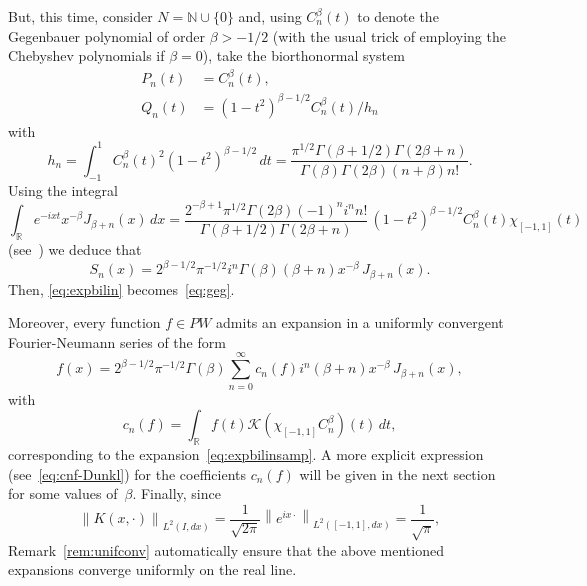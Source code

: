 \documentclass[11pt,a4paper]{amsart}
\theoremstyle{plain}
\theoremstyle{definition}
\newcommand{\N}{\mathbb{N}}
\newcommand{\R}{\mathbb{R}}
\newcommand{\calK}{\mathcal{K}}
\begin{document}
But, this time, consider $N = \N \cup \{0\}$ and,
using $C_n^\beta(t)$ to denote the Gegenbauer polynomial of order
$\beta > -1/2$ (with the usual trick of employing the Chebyshev
polynomials if $\beta = 0$), take the biorthonormal system
\begin{align*}
  P_{n}(t) &= C_{n}^{\beta}(t),\\
  Q_{n}(t) &= (1-t^2)^{\beta-1/2} C_{n}^{\beta}(t)/h_n
\end{align*}
with
\begin{equation*}
  h_n = \int_{-1}^1 C_{n}^{\beta}(t)^2 (1-t^2)^{\beta-1/2}\,dt
  = \frac{\pi^{1/2}\Gamma(\beta+1/2)\Gamma(2\beta+n)}
  {\Gamma(\beta)\Gamma(2\beta)(n+\beta)n!}.
\end{equation*}
Using the integral
\begin{equation*}
  \int_{\R} e^{-ixt}x^{-\beta}J_{\beta+n}(x)\,dx
  = \frac{2^{-\beta+1} \pi^{1/2} \Gamma(2\beta) (-1)^n i^{n} n!}
    {\Gamma(\beta+1/2)\Gamma(2\beta+n)}
  \,(1-t^2)^{\beta-1/2} C_{n}^{\beta}(t) \chi_{[-1,1]}(t)
\end{equation*}
(see~\cite[Ch.~3.3, (9), p.~123]{E-TIT-I}) we deduce that
\begin{equation*}
  S_{n}(x) = 2^{\beta-1/2} \pi^{-1/2} i^n \Gamma(\beta) (\beta+n)
  x^{-\beta}\,J_{\beta+n}(x).
\end{equation*}
Then, \eqref{eq:expbilin} becomes~\eqref{eq:geg}.

Moreover, every function $f \in PW$ admits an expansion
in a uniformly convergent Fourier-Neumann series of the form
\begin{equation*}
  f(x) = 2^{\beta-1/2} \pi^{-1/2} \Gamma(\beta)
  \sum_{n = 0}^{\infty} c_{n}(f) i^n (\beta+n)
  x^{-\beta}\,J_{\beta+n}(x),
\end{equation*}
with
\begin{equation*}
  c_{n}(f) = \int_{\R} f(t) \calK(\chi_{[-1,1]}C_n^{\beta})(t)\,dt,
\end{equation*}
corresponding to the expansion~\eqref{eq:expbilinsamp}. 
A more explicit expression (see~\eqref{eq:cnf-Dunkl}) for the coefficients $c_n(f)$ 
will be given in the next section for some values of~$\beta$.
Finally, since
\begin{equation*}
  \left\|K(x,\cdot)\right\|_{L^{2}(I,dx)}
  = \frac{1}{\sqrt{2\pi}} \left\|e^{ix\cdot}\right\|_{L^{2}([-1,1],dx)}
  = \frac{1}{\sqrt{\pi}},
\end{equation*}
Remark~\ref{rem:unifconv} automatically ensure that the above mentioned 
expansions converge uniformly on the real line.
\end{document}

